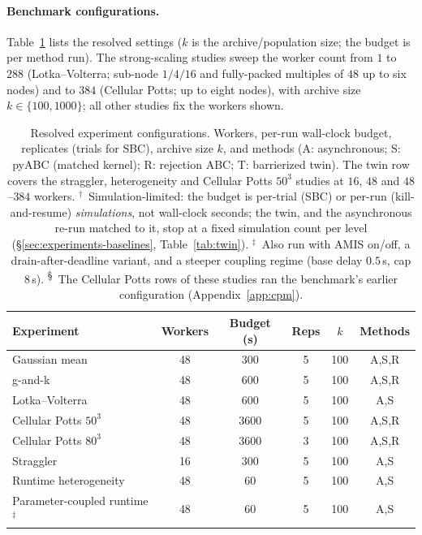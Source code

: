 \documentclass[10pt]{article}
\theoremstyle{plain}
\theoremstyle{definition}
\begin{document}
\paragraph{Benchmark configurations.} Table~\ref{tab:configs} lists the resolved settings ($k$ is the archive/population size; the budget is per method run). The strong-scaling studies sweep the worker count from $1$ to $288$ (Lotka--Volterra; sub-node $1/4/16$ and fully-packed multiples of $48$ up to six nodes) and to $384$ (Cellular Potts; up to eight nodes), with archive size $k\in\{100,1000\}$; all other studies fix the workers shown.

\begin{table}[t]
\caption{Resolved experiment configurations. Workers, per-run wall-clock budget, replicates (trials for SBC), archive size $k$, and methods (A: asynchronous; S: pyABC (matched kernel); R: rejection ABC; T: barrierized twin). The twin row covers the straggler, heterogeneity and Cellular Potts $50^3$ studies at $16$, $48$ and $48$--$384$ workers. $^\dagger$~Simulation-limited: the budget is per-trial (SBC) or per-run (kill-and-resume) \emph{simulations}, not wall-clock seconds; the twin, and the asynchronous re-run matched to it, stop at a fixed simulation count per level (\S\ref{sec:experiments-baselines}, Table~\ref{tab:twin}). $^\ddagger$~Also run with AMIS on/off, a drain-after-deadline variant, and a steeper coupling regime (base delay $0.5$\,s, cap $8$\,s). \textsuperscript{\S}~The Cellular Potts rows of these studies ran the benchmark's earlier configuration (Appendix~\ref{app:cpm}).}\label{tab:configs}
\centering
\begin{tabular}{@{}lccccc@{}}
\toprule
Experiment & Workers & Budget (s) & Reps & $k$ & Methods \\
\midrule
Gaussian mean          & 48 & 300  & 5   & 100 & A,S,R \\
g-and-k                & 48 & 600  & 5   & 100 & A,S,R \\
Lotka--Volterra        & 48 & 600  & 5   & 100 & A,S \\
Cellular Potts $50^3$  & 48 & 3600 & 5   & 100 & A,S,R \\
Cellular Potts $80^3$  & 48 & 3600 & 3   & 100 & A,S,R \\
Straggler              & 16 & 300  & 5   & 100 & A,S \\
Runtime heterogeneity  & 48 & 60   & 5   & 100 & A,S \\
Parameter-coupled runtime$^\ddagger$ & 48 & 60 & 5 & 100 & A,S \\

\end{tabular}
\end{table}
\end{document}
